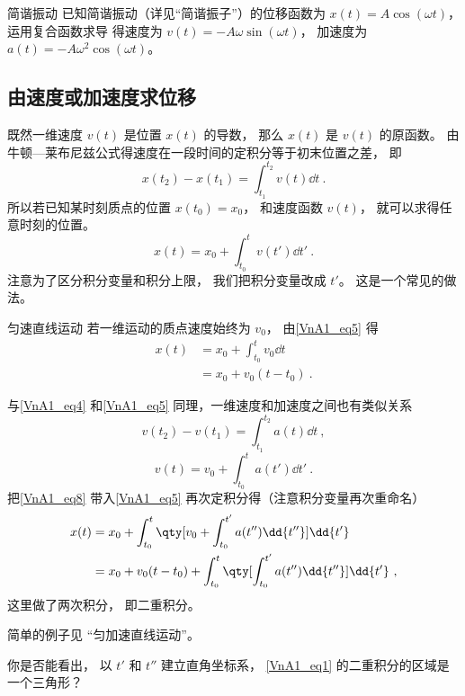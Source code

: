 \begin{example}{简谐振动}
已知简谐振动（详见“简谐振子”）的位移函数为 $x(t) = A\cos(\omega t)$， 运用复合函数求导 得速度为 $v(t) = -A\omega\sin(\omega t)$， 加速度为 $a(t) = -A\omega^2\cos(\omega t)$。
\end{example}

\subsection{由速度或加速度求位移}
既然一维速度 $v(t)$ 是位置 $x(t)$ 的导数， 那么 $x(t)$ 是 $v(t)$ 的原函数。 由牛顿—莱布尼兹公式得速度在一段时间的定积分等于初末位置之差， 即
\begin{equation}\label{VnA1_eq4}
x(t_2) - x(t_1) = \int_{t_1}^{t_2} v(t) \dd{t}~.
\end{equation}
所以若已知某时刻质点的位置 $x(t_0) = x_0$， 和速度函数 $v(t)$， 就可以求得任意时刻的位置。
\begin{equation}\label{VnA1_eq5}
x(t) = x_0 + \int_{t_0}^t v(t') \dd{t'}~.
\end{equation}
注意为了区分积分变量和积分上限， 我们把积分变量改成 $t'$。 这是一个常见的做法。

\begin{example}{匀速直线运动}
若一维运动的质点速度始终为 $v_0$， 由\autoref{VnA1_eq5} 得
\begin{equation}
\begin{aligned}
x(t) &= x_0 + \int_{t_0}^t v_0 \dd{t}\\
&= x_0 + v_0(t-t_0)~.
\end{aligned}
\end{equation}
\end{example}

与\autoref{VnA1_eq4} 和\autoref{VnA1_eq5} 同理，一维速度和加速度之间也有类似关系
\begin{equation}
v(t_2) - v(t_1) = \int_{t_1}^{t_2} a(t) \dd{t}~,
\end{equation}
\begin{equation}\label{VnA1_eq8}
v(t) = v_0 + \int_{t_0}^t a(t') \dd{t'}~.
\end{equation}
把\autoref{VnA1_eq8} 带入\autoref{VnA1_eq5} 再次定积分得（注意积分变量再次重命名）
\begin{equation}\label{VnA1_eq2}
\begin{aligned}
x(t) &= x_0 + \int_{t_0}^t  \qty[v_0 + \int_{t_0}^{t'} a(t'') \dd{t''}] \dd{t'}\\
&= x_0 + v_0 (t - t_0) + \int_{t_0}^t \qty[\int_{t_0}^{t'} a(t'') \dd{t''}] \dd{t'}~,\\
\end{aligned}
\end{equation}
这里做了两次积分， 即二重积分。

简单的例子见 “匀加速直线运动”。

\begin{exercise}{}
你是否能看出， 以 $t'$ 和 $t''$ 建立直角坐标系， \autoref{VnA1_eq1} 的二重积分的区域是一个三角形？
\end{exercise}

